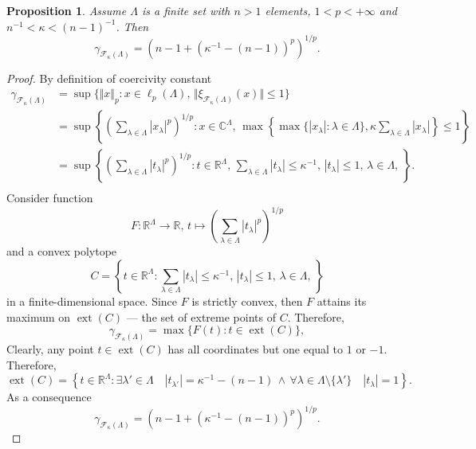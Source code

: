 \documentclass[12pt]{article}
\newtheorem{proposition}[theorem]{Proposition}
\begin{document}
\begin{proposition}\label{StdEmbdSpclCoerciv}
    Assume $\Lambda$ is a finite set with $n>1$ elements, $1<p<+\infty$ 
    and $n^{-1}<\kappa<(n-1)^{-1}$. Then
    \[
        \gamma_{\mathcal{F}_{\kappa}(\Lambda)}
        =(n-1+(\kappa^{-1}-(n-1))^p)^{1/p}.
    \]
\end{proposition}
\begin{proof}
    By definition of coercivity constant
    \[
    \begin{aligned}
        \gamma_{\mathcal{F}_{\kappa}(\Lambda)}
        &=\sup\{
            \Vert x\Vert_p : 
            x\in\ell_p(\Lambda),\, 
            \Vert \xi_{\mathcal{F}_{\kappa}(\Lambda)}(x)\Vert\leq 1
        \} \\
        &=\sup\left\{
            \left( \sum_{\lambda\in\Lambda} |x_\lambda|^p\right)^{1/p} : 
            x\in\mathbb{C}^\Lambda,\, 
            \max\left\{
                \max\{|x_\lambda|:\lambda\in\Lambda\},
                \kappa\sum_{\lambda\in\Lambda} |x_\lambda|
            \right\}\leq 1
        \right\} \\
        &=\sup\left\{
            \left( \sum_{\lambda\in\Lambda} |t_\lambda|^p\right)^{1/p} : 
            t\in\mathbb{R}^\Lambda,\, 
            \sum_{\lambda\in\Lambda} |t_\lambda|\leq \kappa^{-1},\,
            |t_\lambda|\leq 1,\,\lambda\in\Lambda,\,
        \right\}. \\
    \end{aligned}
    \]
    Consider function
    \[
        F:
        \mathbb{R}^\Lambda\to\mathbb{R},\, 
        t\mapsto \left(\sum_{\lambda\in\Lambda}|t_\lambda|^p\right)^{1/p}
    \]
    and a convex polytope
    \[
        C=\left\{ 
            t\in\mathbb{R}^\Lambda : 
            \sum_{\lambda\in\Lambda} |t_\lambda|\leq \kappa^{-1},\,
            |t_\lambda|\leq 1,\,\lambda\in\Lambda,\,
        \right\}
    \]
    in a finite-dimensional space. Since $F$ is strictly convex, then $F$ 
    attains its maximum on $\operatorname{ext}(C)$ --- the set of extreme 
    points of $C$. Therefore,
    \[
        \gamma_{\mathcal{F}_{\kappa}(\Lambda)}=\max\{
            F(t):t\in\operatorname{ext}(C)
        \},
    \]
    Clearly, any point $t\in \operatorname{ext}(C)$ has all coordinates but one
    equal to $1$ or $-1$. Therefore,
    \[
        \operatorname{ext}(C)=\left\{ 
            t\in\mathbb{R}^\Lambda : 
            \exists \lambda'\in\Lambda\quad |t_{\lambda'}|=\kappa^{-1}-(n-1)\,
            \wedge\, 
            \forall \lambda\in\Lambda\setminus\{\lambda'\}\quad |t_\lambda|=1
        \right\}.
    \]
    As a consequence
    \[
        \gamma_{\mathcal{F}_{\kappa}(\Lambda)}=(n-1+(\kappa^{-1}-(n-1))^p)^{1/p}.
    \]
\end{proof}
\end{document}
